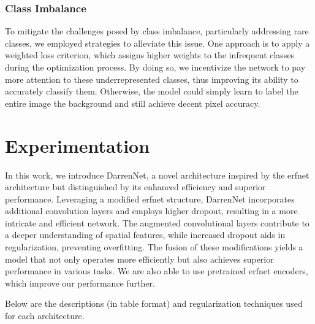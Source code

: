 \subsubsection*{Class Imbalance}
To mitigate the challenges posed by class imbalance, particularly addressing rare classes, we employed strategies to alleviate this issue. One approach is to apply a weighted loss criterion, which assigns higher weights to the infrequent classes during the optimization process. By doing so, we incentivize the network to pay more attention to these underrepresented classes, thus improving its ability to accurately classify them. Otherwise, the model could simply learn to label the entire image the background and still achieve decent pixel accuracy.

\section*{Experimentation}

In this work, we introduce DarrenNet, a novel architecture inspired by the erfnet architecture but distinguished by its enhanced efficiency and superior performance. Leveraging a modified erfnet structure, DarrenNet incorporates additional convolution layers and employs higher dropout, resulting in a more intricate and efficient network. The augmented convolutional layers contribute to a deeper understanding of spatial features, while increased dropout aids in regularization, preventing overfitting. The fusion of these modifications yields a model that not only operates more efficiently but also achieves superior performance in various tasks. We are also able to use pretrained erfnet encoders, which improve our performance further.

Below are the descriptions (in table format) and regularization techniques used for each architecture.

